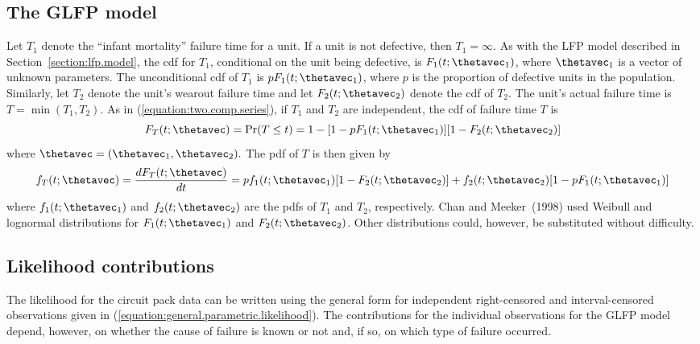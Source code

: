 \subsection{The GLFP model}
 Let $T_{1}$ denote the ``infant mortality'' failure time for a
unit. If a unit is not defective, then $T_{1}=\infty$.  As with the
LFP model described in Section~\ref{section:lfp.model}, the cdf for
$T_{1}$, conditional on the unit being defective, is
$F_{1}(t;\thetavec_{1})$, where $\thetavec_{1}$ is a vector of
unknown parameters.  The unconditional cdf of $T_{1}$ is
$pF_{1}(t;\thetavec_{1})$, where $p$ is the proportion of defective
units in the population.  Similarly, let $T_{2}$ denote the unit's
wearout failure time and let $F_{2}(t;\thetavec_{2})$ denote the cdf
of $T_{2}$. 
The unit's actual
failure time is $T =\min(T_{1},T_{2})$. 
As in (\ref{equation:two.comp.series}), if $T_{1}$ and
$T_{2}$ are independent, the cdf of failure time $T$ is
\begin{equation}
\label{equation:glfp.cdf}
F_{T}(t;\thetavec) =
\Pr(T \leq t) = 1 - [1 - pF_{1}(t;\thetavec_{1})][1 -
F_{2}(t;\thetavec_{2})]
\end{equation}
where $\thetavec = (\thetavec_{1},\thetavec_{2}).$ The pdf of $T$ is
then given by 
\begin{equation}
\label{equation:glfp.pdf}
f_{T}(t;\thetavec) = \frac{dF_{T}(t;\thetavec)}{dt}
= pf_{1}(t;\thetavec_{1})[1-F_{2}(t;\thetavec_{2})] +
f_{2}(t;\thetavec_{2})[1-pF_{1}(t;\thetavec_{1})]
\end{equation}
where
$f_{1}(t;\thetavec_{1})$ and $f_{2}(t;\thetavec_{2})$ are the pdfs
of $T_{1}$ and $T_{2}$, respectively.
Chan and Meeker~(1998) used Weibull and lognormal distributions for
$F_{1}(t;\thetavec_{1})$ and $F_{2}(t;\thetavec_{2})$. Other
distributions could, however, be substituted without difficulty.

\subsection{Likelihood contributions}
The likelihood for the circuit pack data can be written using the
general form for independent right-censored and interval-censored
observations given in
(\ref{equation:general.parametric.likelihood}). The contributions
for the individual observations for the GLFP model depend, however,
on whether the cause of failure is known or not and, if so, on which
type of failure occurred.

